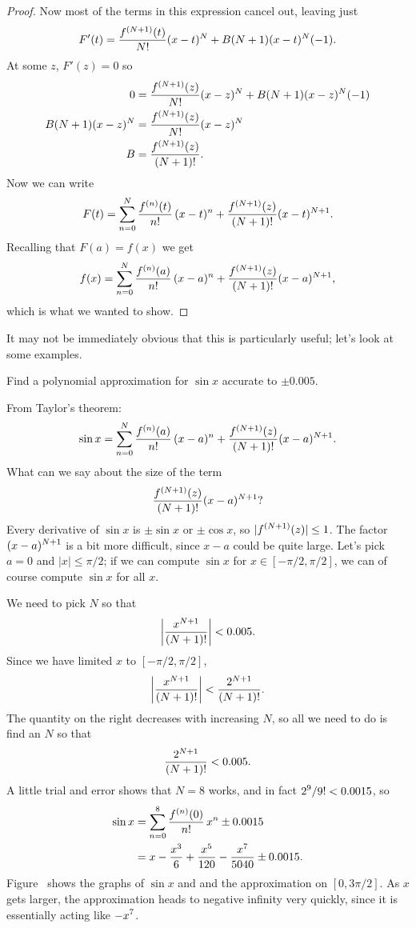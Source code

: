 \begin{proof}
Now most of the terms in this expression cancel out,
leaving just
$$F'(t) = {f^{(N+1)}(t)\over N!}(x-t)^N+B(N+1)(x-t)^N(-1).$$
At some $z$, $F'(z)=0$ so
\begin{align*}
  0&={f^{(N+1)}(z)\over N!}(x-z)^N+B(N+1)(x-z)^N(-1) \\
  B(N+1)(x-z)^N&={f^{(N+1)}(z)\over N!}(x-z)^N \\
  B&={f^{(N+1)}(z)\over (N+1)!}. \\
\end{align*}
Now we can write 
$$
  F(t)=\sum_{n=0}^N{f^{(n)}(t)\over n!}\,(x-t)^n + 
  {f^{(N+1)}(z)\over (N+1)!}(x-t)^{N+1}.
$$
Recalling that $F(a)=f(x)$ we get
$$
  f(x)=\sum_{n=0}^N{f^{(n)}(a)\over n!}\,(x-a)^n + 
  {f^{(N+1)}(z)\over (N+1)!}(x-a)^{N+1},
$$
which is what we wanted to show.
\end{proof}

It may not be immediately obvious that this is particularly useful;
let's look at some examples.

\begin{example} Find a polynomial approximation for $\sin x$ accurate to $\pm
0.005$. 

From Taylor's theorem:
$$
  \sin x= \sum_{n=0}^N{f^{(n)}(a)\over n!}\,(x-a)^n + 
  {f^{(N+1)}(z)\over (N+1)!}(x-a)^{N+1}.
$$
What can we say about the size of the term
$${f^{(N+1)}(z)\over (N+1)!}(x-a)^{N+1}?$$
Every derivative of $\sin x$ is $\pm\sin x$ or $\pm\cos x$, so
$\displaystyle |f^{(N+1)}(z)|\le 1$. The factor $\displaystyle (x-a)^{N+1}$ is a bit more
difficult, since $x-a$ could be quite large. Let's pick $a=0$ and
$|x|\le\pi/2$; if we can compute $\sin x$ for $x\in[-\pi/2,\pi/2]$, we
can of course compute $\sin x$ for all $x$.

We need to pick $N$ so that 
$$\left|{x^{N+1}\over (N+1)!}\right|< 0.005.$$
Since we have limited $x$ to $[-\pi/2,\pi/2]$,
$$\left|{x^{N+1}\over (N+1)!}\right|<{2^{N+1}\over (N+1)!}.$$
The quantity on the right decreases with increasing $N$, so all we
need to do is find an $N$ so that 
$${2^{N+1}\over (N+1)!}<0.005.$$
A little trial and error shows that $N=8$ works, 
and in fact $\displaystyle 2^{9}/9!<0.0015$, so 
\begin{align*}
  \sin x &=\sum_{n=0}^8{f^{(n)}(0)\over n!}\,x^n \pm 0.0015 \\
  &=x-{x^3\over 6}+{x^5\over 120}-{x^7\over 5040}\pm 0.0015. \\
\end{align*}
Figure~ shows the graphs of $\sin x$ and
and the approximation on $[0,3\pi/2]$. As $x$ gets larger, the
approximation heads to negative infinity very quickly, since it is
essentially acting like $\displaystyle -x^7$.
\end{example}

